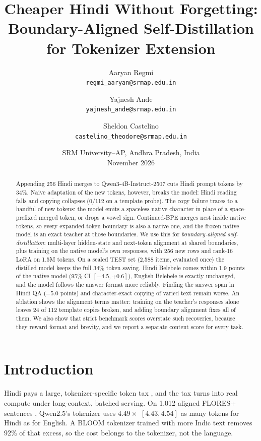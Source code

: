 \documentclass[11pt]{article}
\title{Cheaper Hindi Without Forgetting:\\Boundary-Aligned Self-Distillation for Tokenizer Extension}
\author{
  Aaryan Regmi\\\texttt{regmi\_aaryan@srmap.edu.in}
  \and Yajnesh Ande\\\texttt{yajnesh\_ande@srmap.edu.in}
  \and Sheldon Castelino\\\texttt{castelino\_theodore@srmap.edu.in}
}
\date{SRM University--AP, Andhra Pradesh, India\\[4pt]November 2026}
\begin{document}
\maketitle

\begin{abstract}
Appending 256 Hindi merges to Qwen3-4B-Instruct-2507 cuts Hindi prompt tokens by 34\%. Naive adaptation of the new tokens, however, breaks the model: Hindi reading falls and copying collapses (0/112 on a template probe). The copy failure traces to a handful of new tokens: the model emits a spaceless native character in place of a space-prefixed merged token, or drops a vowel sign.
Continued-BPE merges nest inside native tokens, so every expanded-token boundary is also a native one, and the frozen native model is an exact teacher at those boundaries. We use this for \emph{boundary-aligned self-distillation}: multi-layer hidden-state and next-token alignment at shared boundaries, plus training on the native model's own responses, with 256 new rows and rank-16 LoRA on 1.5M tokens.
On a sealed TEST set (2,588 items, evaluated once) the distilled model keeps the full 34\% token saving. Hindi Belebele comes within 1.9 points of the native model (95\% CI $[-4.5, +0.6]$), English Belebele is exactly unchanged, and the model follows the answer format more reliably. Finding the answer span in Hindi QA ($-5.0$ points) and character-exact copying of varied text remain worse.
An ablation shows the alignment terms matter: training on the teacher's responses alone leaves 24 of 112 template copies broken, and adding boundary alignment fixes all of them. We also show that strict benchmark scores overstate such recoveries, because they reward format and brevity, and we report a separate content score for every task.
\end{abstract}

\section{Introduction}

Hindi pays a large, tokenizer-specific token tax \citep{petrov2023unfairness,ahia2023cost}, and the tax turns into real compute under long-context, batched serving. On 1,012 aligned FLORES+ sentences \citep{nllb2022}, Qwen2.5's tokenizer uses $4.49\times$ $[4.43, 4.54]$ as many tokens for Hindi as for English. A BLOOM tokenizer trained with more Indic text removes 92\% of that excess, so the cost belongs to the tokenizer, not the language.
\end{document}
